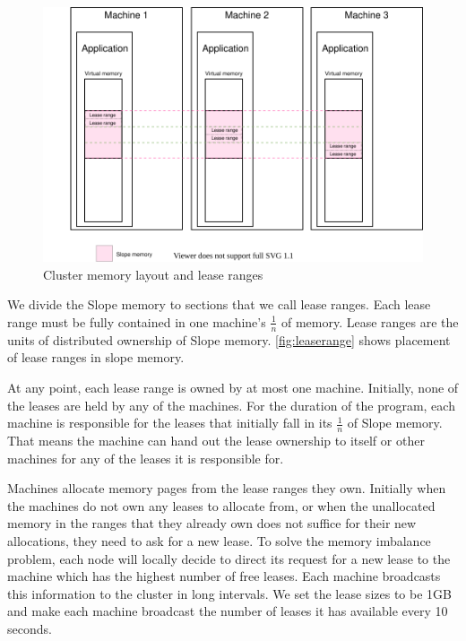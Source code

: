 \begin{figure}[t]
\centering
{}
\includegraphics[width=1\textwidth]{leaserange.drawio}
\caption{
    Cluster memory layout and lease ranges
}
\label{fig:leaserange}
\end{figure}


We divide the Slope memory to sections that we call lease ranges. Each lease
range must be fully contained in one machine's $\frac{1}{n}$ of memory.
Lease ranges are the units of distributed ownership of Slope memory.
\autoref{fig:leaserange} shows placement of lease ranges
in slope memory.


At any point, each lease range is owned by at most
one machine. Initially, none of the leases are held by any of the machines.
For the duration of the program, each machine is responsible for
the leases that initially fall in its $\frac{1}{n}$ of Slope memory.
That means the machine can hand out
the lease ownership to itself or other machines for any of the leases it is
responsible for.


Machines allocate memory pages from the lease ranges they own. Initially when
the machines do not own any leases to allocate from, or when the unallocated
memory in the
ranges that they already own does not suffice for their new allocations, they
need to ask for a new lease. To solve the memory imbalance problem, each node
will locally decide to direct its request for a new lease to the machine which
has the highest number of free leases. Each machine broadcasts this information
to the cluster in long intervals. We set the lease sizes to be 1GB and
make each machine broadcast the number of leases it has available every 10
seconds.

